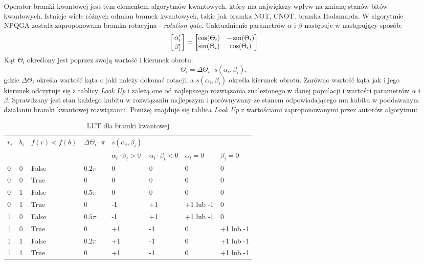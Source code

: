 Operator bramki kwantowej jest tym elementem algorytmów kwantowych, który ma największy wpływ na zmianę stanów bitów kwantowych. Istnieje wiele różnych odmian bramek kwantowych, takie jak bramka NOT, CNOT, bramka Hadamarda. W algorytmie NPQGA została zaproponowana bramka rotacyjna - \textit{rotation gate}. Uaktualnienie parametrów \textit{$\alpha$} i \textit{$\beta$} następuje w następujący sposób:
\newline
\begin{equation}
\left[ {\alpha_i^\prime \atop \beta_i^\prime} \right] = \begin{bmatrix}
\cos(\Theta_i) & -\sin(\Theta_i) \\ \sin(\Theta_i) & \cos(\Theta_i)
\end{bmatrix}
\end{equation}
\newline
Kąt $\Theta_i$ określony jest poprzez swoją wartość i kierunek obrotu:
\newline
\begin{equation}
\Theta_i=\Delta \Theta_i \cdot s(\alpha_i, \beta_i),
\end{equation}
\newline
gdzie $\Delta \Theta_i$ określa wartość kąta o jaki należy dokonać rotacji, a $s(\alpha_i, \beta_i)$ określa kierunek obrotu. Zarówno wartość kąta jak i jego kierunek  odczytuje się z tablicy \textit{Look Up} i zależą one od najlepszego rozwiązania znalezionego w danej populacji i wartości parametrów $\alpha$ i $\beta$. Sprawdzany jest stan każdego kubitu w rozwiązaniu najlepszym i porównywany ze stanem odpowiadającego mu kubitu w poddawanym działaniu bramki kwantowej rozwiązaniu. Poniżej znajduje się tablica  \textit{Look Up} z wartościami zaproponowanymi przez autorów algorytmu:
\begin{table}[h]
\label{LUT_TAB}
\begin{tabular}{l l l l l l l l}
\hline
$r_i$ & $b_i$ & $f(r)<f(b)$ & $\Delta\Theta_i \cdot \pi$ & $s(\alpha_i,\beta_i)$ & & & \\
\cline{5-8} 
& & & & $\alpha_i \cdot \beta_i > 0$ & $\alpha_i \cdot \beta_i < 0$ & $\alpha_i = 0$ & $\beta_i = 0$ \\
\hline
0 & 0 & False & $0.2\pi$ & 0 & 0 & 0 & 0\\
0 & 0 & True  & 0        & 0 & 0 & 0 & 0\\
0 & 1 & False & $0.5\pi$ & 0 & 0 & 0 & 0\\
0 & 1 & True  & 0        & -1 & +1 & +1 lub -1 & 0\\
1 & 0 & False & $0.5\pi$ & -1 & +1 & +1 lub -1 & 0\\
1 & 0 & True  & 0        & +1 & -1 & 0 & +1 lub -1\\
1 & 1 & False & $0.2\pi$ & +1 & -1 & 0 & +1 lub -1\\
1 & 1 & True  & 0        & +1 & -1 & 0 & +1 lub -1\\
\hline
\end{tabular}
\caption{LUT dla bramki kwantowej}
\end{table}

